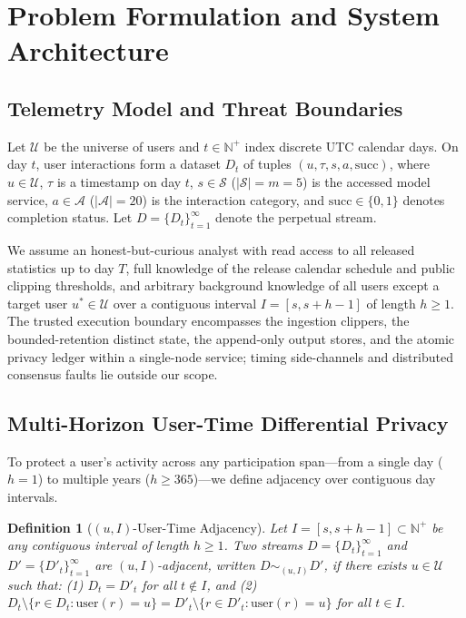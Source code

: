 \documentclass[sigconf, nonacm]{acmart}
\newtheorem{definition}{Definition}
\begin{document}
\section{Problem Formulation and System Architecture}
\label{sec:model}

\subsection{Telemetry Model and Threat Boundaries}
Let $\mathcal{U}$ be the universe of users and $t \in \mathbb{N}^+$ index discrete UTC calendar days. On day $t$, user interactions form a dataset $D_t$ of tuples $(u, \tau, s, a, \mathrm{succ})$, where $u \in \mathcal{U}$, $\tau$ is a timestamp on day $t$, $s \in \mathcal{S}$ ($|\mathcal{S}| = m = 5$) is the accessed model service, $a \in \mathcal{A}$ ($|\mathcal{A}| = 20$) is the interaction category, and $\mathrm{succ} \in \{0,1\}$ denotes completion status. Let $D = \{D_t\}_{t=1}^\infty$ denote the perpetual stream.

We assume an honest-but-curious analyst with read access to all released statistics up to day $T$, full knowledge of the release calendar schedule and public clipping thresholds, and arbitrary background knowledge of all users except a target user $u^* \in \mathcal{U}$ over a contiguous interval $I = [s, s+h-1]$ of length $h \ge 1$. The trusted execution boundary encompasses the ingestion clippers, the bounded-retention distinct state, the append-only output stores, and the atomic privacy ledger within a single-node service; timing side-channels and distributed consensus faults lie outside our scope.

\subsection{Multi-Horizon User-Time Differential Privacy}
To protect a user's activity across any participation span---from a single day ($h=1$) to multiple years ($h \ge 365$)---we define adjacency over contiguous day intervals.

\begin{definition}[$(u, I)$-User-Time Adjacency]
\label{def:adjacency}
Let $I = [s, s + h - 1] \subset \mathbb{N}^+$ be any contiguous interval of length $h \ge 1$. Two streams $D = \{D_t\}_{t=1}^\infty$ and $D' = \{D'_t\}_{t=1}^\infty$ are $(u, I)$-adjacent, written $D \sim_{(u, I)} D'$, if there exists $u \in \mathcal{U}$ such that: (1) $D_t = D'_t$ for all $t \notin I$, and (2) $D_t \setminus \{r \in D_t : \mathrm{user}(r) = u\} = D'_t \setminus \{r \in D'_t : \mathrm{user}(r) = u\}$ for all $t \in I$.
\end{definition}
\end{document}
